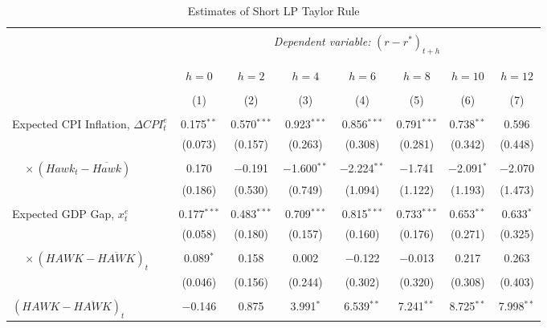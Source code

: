 \documentclass[11pt]{article}
\begin{document}
\begin{table}[!htbp] \centering \scriptsize
    \begin{threeparttable}
    \caption{Estimates of Short LP Taylor Rule} 
    \label{tab:LP_short_full} 
    \begin{tabular}{@{\extracolsep{3pt}}lccccccc} 
      \\[-1.8ex]\hline 
      \hline \\[-1.8ex] 
       & \multicolumn{7}{c}{\textit{Dependent variable:} $\left(r-r^*\right)_{t+h}$} \\ 
       \\[-1.8ex] 
      \cline{2-8} 
      \\[-1.8ex] & $h=0$ & $h=2$ & $h=4$ & $h=6$ & $h=8$ & $h=10$ & $h=12$ \\ 
      \\[-1.8ex] & (1) & (2) & (3) & (4) & (5) & (6) & (7)\\ 
      \hline \\[-1.8ex] 
       Expected CPI Inflation, $\Delta\mathit{CPI}_t^e$ & 0.175$^{**}$ & 0.570$^{***}$ & 0.923$^{***}$ & 0.856$^{***}$ & 0.791$^{***}$ & 0.738$^{**}$ & 0.596 \\ 
       & (0.073) & (0.157) & (0.263) & (0.308) & (0.281) & (0.342) & (0.448) \\ 
        & & & & & & & \\ 
        $\quad \times \left(\mathit{Hawk}_t-\overline{\mathit{Hawk}}\right)$ & 0.170 & $-$0.191 & $-$1.600$^{**}$ & $-$2.224$^{**}$ & $-$1.741 & $-$2.091$^{*}$ & $-$2.070 \\ 
        & (0.186) & (0.530) & (0.749) & (1.094) & (1.122) & (1.193) & (1.473) \\ 
        & & & & & & & \\ 
       Expected GDP Gap, $x_{t}^e$ & 0.177$^{***}$ & 0.483$^{***}$ & 0.709$^{***}$ & 0.815$^{***}$ & 0.733$^{***}$ & 0.653$^{**}$ & 0.633$^{*}$ \\ 
       & (0.058) & (0.180) & (0.157) & (0.160) & (0.176) & (0.271) & (0.325) \\ 
        & & & & & & & \\ 
       $\quad \times \left(\mathit{HAWK}-\overline{\mathit{HAWK}}\right)_t$ & 0.089$^{*}$ & 0.158 & 0.002 & $-$0.122 & $-$0.013 & 0.217 & 0.263 \\ 
       & (0.046) & (0.156) & (0.244) & (0.302) & (0.320) & (0.308) & (0.403) \\ 
       & & & & & & & \\ 
    $\left(\mathit{HAWK}-\overline{\mathit{HAWK}}\right)_t$ & $-$0.146 & 0.875 & 3.991$^{*}$ & 6.539$^{**}$ & 7.241$^{**}$ & 8.725$^{**}$ & 7.998$^{**}$ \\ 

\end{tabular}
\end{threeparttable}
\end{table}
\end{document}
